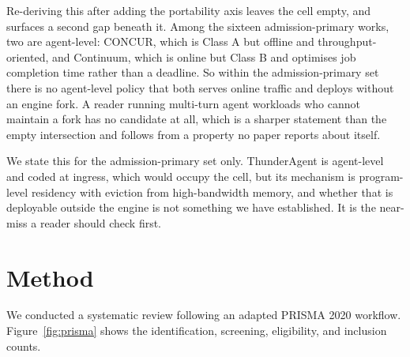 Re-deriving this after adding the portability axis leaves the cell
empty, and surfaces a second gap beneath it. Among the sixteen
admission-primary works, two are agent-level: CONCUR, which is Class A
but offline and throughput-oriented, and Continuum, which is online but
Class B and optimises job completion time rather than a deadline. So
within the admission-primary set there is no agent-level policy that
both serves online traffic and deploys without an engine fork. A reader
running multi-turn agent workloads who cannot maintain a fork has no
candidate at all, which is a sharper statement than the empty
intersection and follows from a property no paper reports about itself.

We state this for the admission-primary set only. ThunderAgent
\citep{kang2026thunderagent} is agent-level and coded at ingress, which
would occupy the cell, but its mechanism is program-level residency with
eviction from high-bandwidth memory, and whether that is deployable
outside the engine is not something we have established. It is the
near-miss a reader should check first.

\section{Method}
\label{sec:method}

We conducted a systematic review following an adapted PRISMA 2020
workflow. Figure~\ref{fig:prisma} shows the identification,
screening, eligibility, and inclusion counts.

